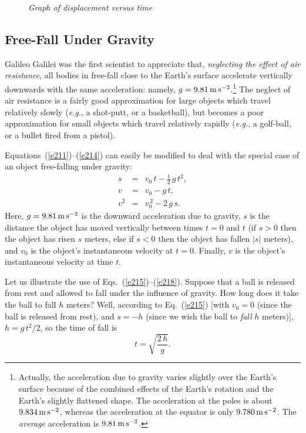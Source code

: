 \begin{figure}
\epsfysize=3in
\centerline{}
\caption{\em Graph of displacement versus time}\label{f9}   
\end{figure}

\subsection{Free-Fall Under Gravity}
Galileo Galilei was the first scientist to appreciate that, {\em neglecting the
effect of air resistance},  all bodies in free-fall close to the Earth's
surface accelerate vertically downwards with the same acceleration: namely,
$g=9.81\,{\rm m\,s^{-2}}$.\footnote{Actually, the acceleration due to gravity varies
slightly over the Earth's surface because of the combined effects of the Earth's rotation and
the Earth's slightly flattened shape. The acceleration at the poles is about
$9.834\,{\rm m\,s^{-2}}$, whereas the acceleration at the equator is
only $9.780\,{\rm m\,s^{-2}}$. The {\em average} acceleration is $9.81\,{\rm m\,s^{-2}}$.}
The neglect of air resistance is a fairly good approximation for large objects
which travel relatively slowly ({\em e.g.}, a shot-putt, or a basketball), but
becomes a poor approximation for small objects which travel relatively rapidly
({\em e.g.}, a golf-ball, or a bullet fired from a pistol).

Equations~(\ref{e211})--(\ref{e214}) can easily be modified to deal with the
special case of an object free-falling under gravity:
\begin{eqnarray}
s &=& v_0\,t -\frac{1}{2} \,g\,t^2,\label{e215}\\
v  &=& v_0 - g\,t,\label{e217}\\
v^2 &=& v_0^{\,2} - 2\,g\,s.\label{e218}
\end{eqnarray}
Here, $g=9.81\,{\rm m\,s^{-2}}$ is the downward acceleration due to gravity, $s$ is the
distance the object has moved vertically between times  $t=0$ and $t$ (if $s>0$ then the object has
risen $s$ meters, else if $s<0$ then the object has
fallen $|s|$ meters), and  $v_0$ is the object's instantaneous velocity at $t=0$. Finally,
$v$ is the object's instantaneous velocity at time $t$. 

Let us illustrate the use of Eqs.~(\ref{e215})--(\ref{e218}). Suppose that
a ball is released from rest and allowed to fall under the influence of gravity.
How long does it take the ball to fall $h$ meters? Well, according to Eq.~(\ref{e215})
[with $v_0=0$ (since the ball is released from rest), and $s=-h$ (since we wish the
ball to {\em fall} $h$ meters)], $h= g\,t^2/2$, so the time of fall is
\begin{equation}\label{e2.19}
t = \sqrt{\frac{2\,h}{g}}.
\end{equation}


